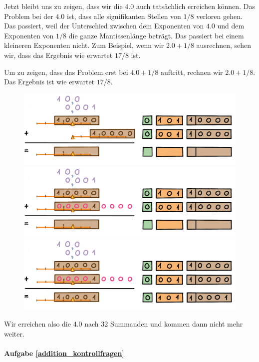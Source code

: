 Jetzt bleibt uns zu zeigen, dass wir die \(4.0\) auch tatsächlich erreichen können. Das Problem bei der \(4.0\) ist, dass alle signifikanten Stellen von \(1/8\) verloren gehen. Das passiert, weil der Unterschied zwischen dem Exponenten von \(4.0\) und dem Exponenten von \(1/8\) die ganze Mantissenlänge beträgt. Das passiert bei einem kleineren Exponenten nicht. Zum Beispiel, wenn wir \(2.0 + 1/8\) ausrechnen, sehen wir, dass das Ergebnis wie erwartet \(17/8\) ist.

Um zu zeigen, dass das Problem erst bei \(4.0 + 1/8\) auftritt, rechnen wir \(2.0 + 1/8\). Das Ergebnis ist wie erwartet \(17/8\).
\begin{figure}[H]
\centering
\includegraphics[width=\linewidth]{Pictures/Addition2and1-8_1.png} 
\includegraphics[width=\linewidth]{Pictures/Addition2and1-8_2.png} 
\includegraphics[width=\linewidth]{Pictures/Addition2and1-8_3.png} 
\end{figure}
Wir erreichen also die \(4.0\) nach 32 Summanden und kommen dann nicht mehr weiter.


\paragraph{Aufgabe \ref{addition_kontrollfragen}}


